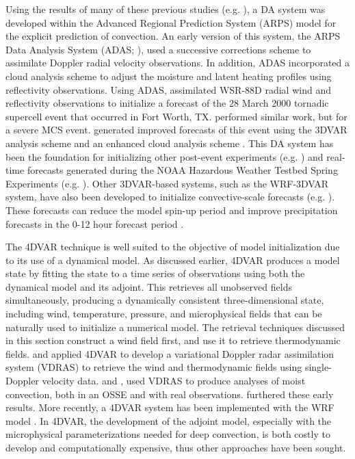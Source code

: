 Using the results of many of these previous studies (e.g. \citealt{shapiroetal95,gaoetal01}), a DA system was developed within the Advanced Regional Prediction System (ARPS) model \citep{xueetal95,xueetal00,xueetal01} for the explicit prediction of convection. An early version of this system, the ARPS Data Analysis System (ADAS; \citealt{brewster96}), used a successive corrections scheme \citet{bratseth86} to assimilate Doppler radial velocity observations. In addition, ADAS incorporated a cloud analysis scheme \citep{albertsetal96,zhangetal98} to adjust the moisture and latent heating profiles using reflectivity observations. Using ADAS, \citet{xueetal03} assimilated WSR-88D radial wind and reflectivity observations to initialize a forecast of the 28 March 2000 tornadic supercell event that occurred in Fort Worth, TX. \citet{dawsonxue06} performed similar work, but for a severe MCS event. \citet{huetal06a,huetal06b} generated improved forecasts of this event using the \citealt{gaoetal04} 3DVAR analysis scheme and an enhanced cloud analysis scheme \citep{brewster02,gaoetal02}. This DA system has been the foundation for initializing other post-event experiments (e.g. \citealt{huetal07,schenkmanetal11,xueetal13}) and real-time forecasts generated during the NOAA Hazardous Weather Testbed Spring Experiments (e.g. \citealt{xueetal08}). Other 3DVAR-based systems, such as the WRF-3DVAR system, have also been developed to initialize convective-scale forecasts (e.g. \citealt{barkeretal04,xiaosun07,zhaoetal08}). These forecasts can reduce the model spin-up period and improve precipitation forecasts in the 0-12 hour forecast period \citep{kainetal10,sunetal12}.

The 4DVAR technique is well suited to the objective of model initialization due to its use of a dynamical model. As discussed earlier, 4DVAR produces a model state by fitting the state to a time series of observations using both the dynamical model and its adjoint. This retrieves all unobserved fields simultaneously, producing a dynamically consistent three-dimensional state, including wind, temperature, pressure, and microphysical fields that can be naturally used to initialize a numerical model. The retrieval techniques discussed in this section construct a wind field first, and use it to retrieve thermodynamic fields. \citet{sunetal91} and \citet{suncrook94} applied 4DVAR to develop a variational Doppler radar assimilation system (VDRAS) to retrieve the wind and thermodynamic fields using single-Doppler velocity data. \citet{suncrook97} and \citet{suncrook98}, used VDRAS to produce analyses of moist convection, both in an OSSE and with real observations. \citet{wuetal00} furthered these early results. More recently, a 4DVAR system has been implemented with the WRF model \citep{wangetal13}. In 4DVAR, the development of the adjoint model, especially with the microphysical parameterizations needed for deep convection, is both costly to develop and computationally expensive, thus other approaches have been sought.

